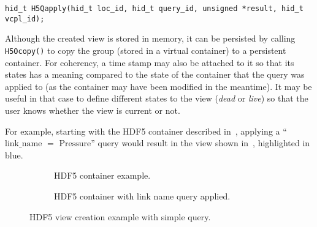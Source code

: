 {
\begin{lstlisting}
hid_t H5Qapply(hid_t loc_id, hid_t query_id, unsigned *result, hid_t vcpl_id);
\end{lstlisting}
}

Although the created view is stored in memory, it can be persisted
by calling \texttt{H5Ocopy()} to copy the group (stored in a virtual
container) to a persistent container. For
coherency, a time stamp may also be attached to it so that its states has a meaning
compared to the state of the container that the query was applied to (as the
container may have been modified in the meantime). It may be useful in
that case to define different states to the view (\textit{dead} or
\textit{live}) so that the user knows whether the view is current or not.




For example, starting with the HDF5 container described in~,
applying a ``$\mathrm{link\_name}$ $\mathrm{=}$ $\mathrm{Pressure}$''
query would result in the view shown in~, highlighted in blue.
\begin{figure}
\begin{subfigure}[b]{.49\linewidth}
\centering
\resizebox{\textwidth}{!}{
  
}
\caption{HDF5 container example.}
\label{fig:hdf5_view1}
\end{subfigure}
\hfill
\begin{subfigure}[b]{.49\linewidth}
\centering
\resizebox{\textwidth}{!}{
  
}
\caption{HDF5 container with link name query applied.}
\label{fig:hdf5_view2}
\end{subfigure}
\caption{HDF5 view creation example with simple query.}
\end{figure}

